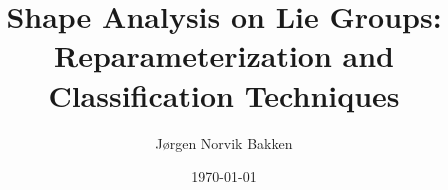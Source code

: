 \documentclass[british,titlepage]{ntnuthesis}
\title{Shape Analysis on Lie Groups: \\ Reparameterization and Classification Techniques}
\author{Jørgen Norvik Bakken}
\date{\today}
\begin{document}




\tableofcontents
\listoffigures
\listoftables
\listofalgorithms

                   


                      

            

\chapter*{\bibname}
\begin{sloppypar}
\printbibliography[heading=none]
\end{sloppypar}

\appendix


\end{document}
